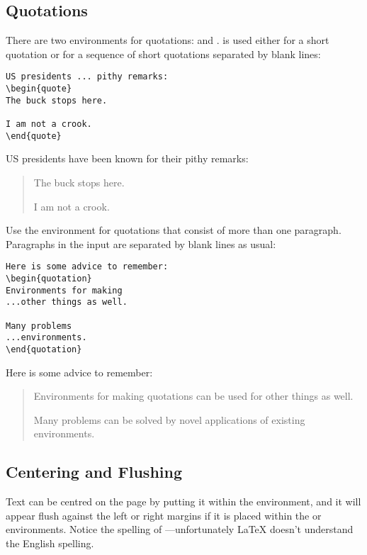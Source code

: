 \subsection{Quotations}

There are two environments for quotations:  and .
 is used either for a short quotation or for a sequence of
short quotations separated by blank lines:
\egstart
\begin{verbatim}
US presidents ... pithy remarks:
\begin{quote}
The buck stops here.

I am not a crook.
\end{quote}
\end{verbatim}
\egmid%
US presidents have been known for their pithy remarks:
\begin{quote}
The buck stops here.

I am not a crook.
\end{quote}
\egend

Use the  environment for quotations that consist of more
than one paragraph.  Paragraphs in the input are separated by blank
lines as usual:
\egstart
\begin{verbatim}
Here is some advice to remember:
\begin{quotation}
Environments for making
...other things as well.

Many problems
...environments.
\end{quotation}
\end{verbatim}
\egmid%
Here is some advice to remember:
\begin{quotation}
Environments for making quotations
can be used for other things as well.

Many problems can be solved by
novel applications of existing
environments.
\end{quotation}
\egend

\subsection{Centering and Flushing}

Text can be centred on the page by putting it within the 
environment, and it will appear flush against the left or right margins if it
is placed within the  or  environments.
Notice the
spelling of ---unfortunately \LaTeX{} doesn't understand the English
spelling.


